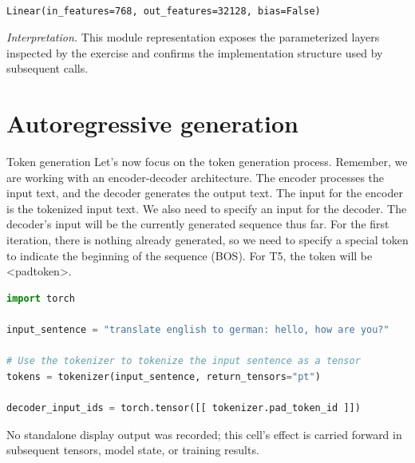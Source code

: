 \documentclass[../labs.tex]{subfiles}
\begin{document}
\begin{lstlisting}[basicstyle=\ttfamily\scriptsize,breaklines=true,breakatwhitespace=false,columns=fullflexible,keepspaces=true]

Linear(in_features=768, out_features=32128, bias=False)

\end{lstlisting}

\noindent\emph{Interpretation.} This module representation exposes the parameterized layers inspected by the exercise and confirms the implementation structure used by subsequent calls.

\section{Autoregressive generation}



\noindent Token generation Let's now focus on the token generation process. Remember, we are working with an encoder-decoder architecture. The encoder processes the input text, and the decoder generates the output text. The input for the encoder is the tokenized input text. We also need to specify an input for the decoder. The decoder's input will be the currently generated sequence thus far. For the first iteration, there is nothing already generated, so we need to specify a special token to indicate the beginning of the sequence (BOS). For T5, the token will be <padtoken>.

\begin{lstlisting}[language=Python,basicstyle=\ttfamily\scriptsize,breaklines=true,breakatwhitespace=false,columns=fullflexible,keepspaces=true,numbers=none]
import torch

input_sentence = "translate english to german: hello, how are you?"

# Use the tokenizer to tokenize the input sentence as a tensor
tokens = tokenizer(input_sentence, return_tensors="pt")

decoder_input_ids = torch.tensor([[ tokenizer.pad_token_id ]])
\end{lstlisting}

\hypertarget{res:lab02-text-01-t5-ipynb-69-00175aa998c6}{}\noindent No standalone display output was recorded; this cell’s effect is carried forward in subsequent tensors, model state, or training results.

\end{document}
